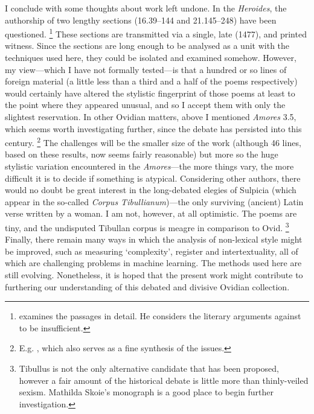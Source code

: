 \documentclass[twocolumn, switch, a4paper]{article} %
\begin{document}
I conclude with some thoughts about work left undone. In the \emph{Heroides},
the authorship of two lengthy sections (16.39--144 and 21.145--248) have been
questioned.%
%
    \footnote{ examines the passages in detail. He
    considers the literary arguments against to be insufficient.}
%
These sections are transmitted via a single, late (1477), and printed witness.
Since the sections are long enough to be analysed as a unit with the
techniques used here, they could be isolated and examined somehow. However, my
view---which I have not formally tested---is that a hundred or so lines of
foreign material (a little less than a third and a half of the poems
respectively) would certainly have altered the stylistic fingerprint of those
poems at least to the point where they appeared unusual, and so I accept them
with only the slightest reservation. In other Ovidian matters, above I
mentioned \emph{Amores} 3.5, which seems worth investigating further, since
the debate has persisted into this century.%
%
    \footnote{E.g. , which also serves as a
    fine synthesis of the issues.}
%
The challenges will be the smaller size of the work (although 46 lines, based
on these results, now seems fairly reasonable) but more so the huge stylistic
variation encountered in the \emph{Amores}---the more things vary, the more
difficult it is to decide if something is atypical. Considering other authors,
there would no doubt be great interest in the long-debated elegies of Sulpicia
(which appear in the so-called \emph{Corpus Tibullianum})---the only surviving
(ancient) Latin verse written by a woman. I am not, however, at all
optimistic. The poems are tiny, and the undisputed Tibullan corpus is meagre
in comparison to Ovid.%
%
    \footnote{Tibullus is not the only alternative candidate that has been
    proposed, however a fair amount of the historical debate is little more
    than thinly-veiled sexism. Mathilda Skoie's \citeyear{skoie2002reading}
    monograph is a good place to begin further investigation.}
%
Finally, there remain many ways in which the analysis of non-lexical style
might be improved, such as measuring `complexity', register and
intertextuality, all of which are challenging problems in machine learning.
The methods used here are still evolving. Nonetheless, it is hoped that the
present work might contribute to furthering our understanding of this debated
and divisive Ovidian collection.

\end{document}
